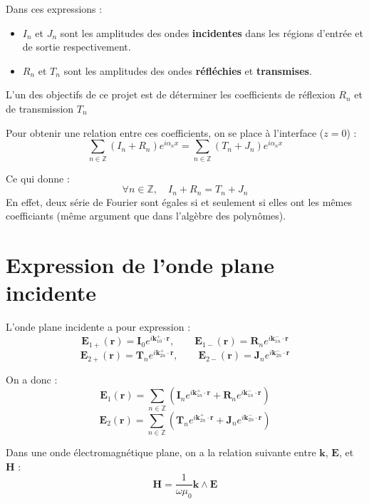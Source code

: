 \documentclass{article}
\begin{document}
\medskip


Dans ces expressions :
\begin{itemize}
  \item \( I_n \) et \( J_n \) sont les amplitudes des ondes \textbf{incidentes} dans les régions d'entrée et de sortie respectivement.
  \item \( R_n \) et \( T_n \) sont les amplitudes des ondes \textbf{réfléchies} et \textbf{transmises}.
\end{itemize}

\medskip

L’un des objectifs de ce projet est de déterminer les coefficients de réflexion \( R_n \) et de transmission \( T_n \)

Pour obtenir une relation entre ces coefficients, on se place à l'interface ($z = 0$) :
\[
\sum_{n \in \mathbb{Z}} \left( I_n + R_n \right) e^{i \alpha_n x}
=
\sum_{n \in \mathbb{Z}} \left( T_n + J_n \right) e^{i \alpha_n x}
\]

Ce qui donne :
\[
\forall n \in \mathbb{Z}, \quad I_n + R_n = T_n + J_n
\]
En effet, deux série de Fourier sont égales si et seulement si elles ont les mêmes coefficiants (même argument que dans l'algèbre des polynômes).
\section*{Expression de l’onde plane incidente}

L’onde plane incidente a pour expression :
\[
\mathbf{E}_{1+}(\mathbf{r}) = \mathbf{I}_0 e^{i \mathbf{k}_{10}^{+} \cdot \mathbf{r}}, \qquad
\mathbf{E}_{1-}(\mathbf{r}) = \mathbf{R}_n e^{i \mathbf{k}_{1n}^{-} \cdot \mathbf{r}}
\]
\[
\mathbf{E}_{2+}(\mathbf{r}) = \mathbf{T}_n e^{i \mathbf{k}_{2n}^{+} \cdot \mathbf{r}}, \qquad
\mathbf{E}_{2-}(\mathbf{r}) = \mathbf{J}_n e^{i \mathbf{k}_{2n}^{-} \cdot \mathbf{r}}
\]

On a donc :
\[
\mathbf{E}_1(\mathbf{r}) = \sum_{n \in \mathbb{Z}} \left( \mathbf{I}_n e^{i \mathbf{k}_{1n}^{+} \cdot \mathbf{r}} + \mathbf{R}_n e^{i \mathbf{k}_{1n}^{-} \cdot \mathbf{r}} \right)
\]
\[
\mathbf{E}_2(\mathbf{r}) = \sum_{n \in \mathbb{Z}} \left( \mathbf{T}_n e^{i \mathbf{k}_{2n}^{+} \cdot \mathbf{r}} + \mathbf{J}_n e^{i \mathbf{k}_{2n}^{-} \cdot \mathbf{r}} \right)
\]

Dans une onde électromagnétique plane, on a la relation suivante entre $\mathbf{k}$, $\mathbf{E}$, et $\mathbf{H}$ :
\[
\mathbf{H} = \frac{1}{\omega \mu_0} \mathbf{k} \wedge \mathbf{E}
\]
\end{document}
